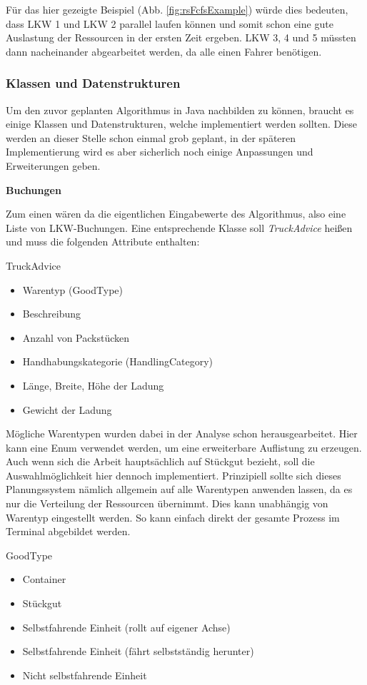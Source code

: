 Für das hier gezeigte Beispiel (Abb. \ref{fig:rsFcfsExample}) würde dies bedeuten, dass LKW 1 und LKW 2 parallel laufen können und somit schon eine gute Auslastung der Ressourcen in der ersten Zeit ergeben. LKW 3, 4 und 5 müssten dann nacheinander abgearbeitet werden, da alle einen Fahrer benötigen.


\subsubsection{Klassen und Datenstrukturen}
\label{sec:planungRsDatenstrukturen}

Um den zuvor geplanten Algorithmus in Java nachbilden zu können, braucht es einige Klassen und Datenstrukturen, welche implementiert werden sollten. Diese werden an dieser Stelle schon einmal grob geplant, in der späteren Implementierung wird es aber sicherlich noch einige Anpassungen und Erweiterungen geben.

\textbf{Buchungen}

Zum einen wären da die eigentlichen Eingabewerte des Algorithmus, also eine Liste von LKW-Buchungen. Eine entsprechende Klasse soll \textit{TruckAdvice} heißen und muss die folgenden Attribute enthalten:

TruckAdvice
\begin{itemize}
    \item Warentyp (GoodType)
    \item Beschreibung
    \item Anzahl von Packstücken
    \item Handhabungskategorie (HandlingCategory)
    \item Länge, Breite, Höhe der Ladung
    \item Gewicht der Ladung
\end{itemize}

Mögliche Warentypen wurden dabei in der Analyse schon herausgearbeitet. Hier kann eine Enum verwendet werden, um eine erweiterbare Auflistung zu erzeugen. Auch wenn sich die Arbeit hauptsächlich auf Stückgut bezieht, soll die Auswahlmöglichkeit hier dennoch implementiert. Prinzipiell sollte sich dieses Planungssystem nämlich allgemein auf alle Warentypen anwenden lassen, da es nur die Verteilung der Ressourcen übernimmt. Dies kann unabhängig von Warentyp eingestellt werden. So kann einfach direkt der gesamte Prozess im Terminal abgebildet werden.

GoodType
\begin{itemize}
    \item Container
    \item Stückgut
    \item Selbstfahrende Einheit (rollt auf eigener Achse)
    \item Selbstfahrende Einheit (fährt selbstständig herunter)
    \item Nicht selbstfahrende Einheit
\end{itemize}


